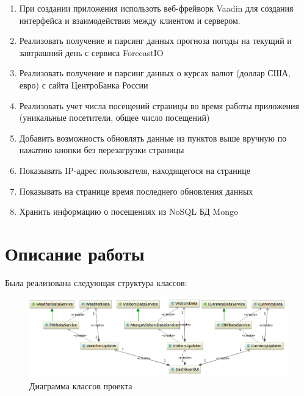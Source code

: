 \documentclass{article}
\begin{document}
\begin{enumerate}

\item При создании приложения использоть веб-фрейворк Vaadin для создания интерфейса и взаимодействия между клиентом и сервером.
\item Реализовать получение и парсинг данных прогноза погоды на текущий и завтрашний день с сервиса ForecastIO
\item Реализовать получение и парсинг данных о курсах валют (доллар США, евро) с сайта ЦентроБанка России
\item Реализовать учет числа посещений страницы во время работы приложения (уникальные посетители, общее число посещений)
\item Добавить возможность обновлять данные из пунктов выше вручную по нажатию кнопки без перезагрузки страницы
\item Показывать IP-адрес пользователя, находящегося на странице
\item Показывать на странице время последнего обновления данных
\item Хранить информацию о посещениях из NoSQL БД Mongo

\end{enumerate}

\section*{Описание работы}

Была реализована следующая структура классов:

\begin{figure}[h]
\centering
\includegraphics[width=\textwidth]{uml}
\caption{Диаграмма классов проекта}
\end{figure}
\end{document}
